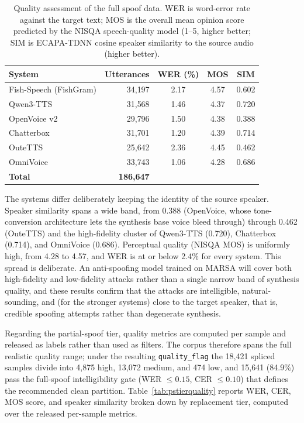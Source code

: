 \documentclass[11pt]{article}
\begin{document}
\begin{table}[H]
\centering
\caption{Quality assessment of the full spoof data. 
WER is word-error rate against the target
text; MOS is the overall mean opinion score predicted by the NISQA speech-quality model \citep{nisqa} (1--5, higher better; SIM
is ECAPA-TDNN cosine speaker similarity to the source audio (higher better).}
\label{tab:fullspoof}
\small
\begin{tabular}{lrccc}
\toprule
\textbf{System} & \textbf{Utterances} & \textbf{WER (\%)} & \textbf{MOS} & \textbf{SIM} \\
\midrule
Fish-Speech (FishGram) & 34{,}197 & 2.17 & 4.57 & 0.602 \\
Qwen3-TTS              & 31{,}568 & 1.46 & 4.37 & 0.720 \\
OpenVoice v2           & 29{,}796 & 1.50 & 4.38 & 0.388 \\
Chatterbox             & 31{,}701 & 1.20 & 4.39 & 0.714 \\
OuteTTS                & 25{,}642 & 2.36 & 4.45 & 0.462 \\
OmniVoice              & 33{,}743 & 1.06 & 4.28 & 0.686 \\
\midrule
\textbf{Total}         & \textbf{186{,}647} & & & \\
\bottomrule
\end{tabular}
\end{table}

The systems differ deliberately keeping the identity of the source speaker. Speaker similarity
spans a wide band, from 0.388 (OpenVoice, whose tone-conversion
architecture lets the synthesis base voice bleed through) through 0.462
(OuteTTS) and the high-fidelity cluster of Qwen3-TTS (0.720), Chatterbox
(0.714), and OmniVoice (0.686). Perceptual quality (NISQA MOS) is
uniformly high, from 4.28 to 4.57, and WER is at or below
2.4\% for every system. This spread is deliberate. An anti-spoofing model trained on
MARSA will cover both high-fidelity and low-fidelity attacks rather than a
single narrow band of synthesis quality, and these results confirm that
the attacks are intelligible, natural-sounding, and (for the stronger
systems) close to the target speaker, that is, credible spoofing
attempts rather than degenerate synthesis. 

Regarding the partial-spoof tier, quality metrics
are computed per sample and released as labels rather than used as
filters. The corpus therefore spans the full realistic quality range;
under the resulting \texttt{quality\_flag} the 18{,}421 spliced samples
divide into 4{,}875 high, 13{,}072 medium, and 474 low, and 15{,}641
(84.9\%) pass the full-spoof intelligibility gate (WER $\leq 0.15$,
CER $\leq 0.10$) that defines the recommended clean partition.
Table~\ref{tab:pstierquality} reports WER, CER, MOS score, and speaker
similarity broken down by replacement tier, computed over the released
per-sample metrics.
\end{document}
